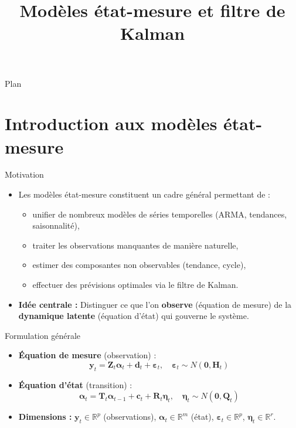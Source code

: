 \documentclass[11pt,aspectratio=169]{beamer}
\title{Modèles état-mesure et filtre de Kalman}
\author{}
\date{}
\institute{}
\newcommand{\R}{\mathbb{R}}
\begin{document}
\begin{frame}
\titlepage
\end{frame}

\begin{frame}{Plan}
\tableofcontents
\end{frame}

\section{Introduction aux modèles état-mesure}

\begin{frame}{Motivation}

\begin{itemize}

\item Les modèles état-mesure constituent un cadre général permettant de :
  \begin{itemize}
  \item unifier de nombreux modèles de séries temporelles (ARMA, tendances, saisonnalité),
  \item traiter les observations manquantes de manière naturelle,
  \item estimer des composantes non observables (tendance, cycle),
  \item effectuer des prévisions optimales via le filtre de Kalman.\newline
  \end{itemize}

\item \textbf{Idée centrale :} Distinguer ce que l'on \textbf{observe} (équation de mesure) de la \textbf{dynamique latente} (équation d'état) qui gouverne le système.

\end{itemize}

\end{frame}

\begin{frame}{Formulation générale}

\begin{itemize}

\item \textbf{Équation de mesure} (observation) :
  \[
  \bm{y}_t = \bm{Z}_t \bm{\alpha}_t + \bm{d}_t + \bm{\varepsilon}_t, \quad \bm{\varepsilon}_t \sim N(\bm{0}, \bm{H}_t)
  \]\newline

\item \textbf{Équation d'état} (transition) :
  \[
  \bm{\alpha}_t = \bm{T}_t \bm{\alpha}_{t-1} + \bm{c}_t + \bm{R}_t \bm{\eta}_t, \quad \bm{\eta}_t \sim N(\bm{0}, \bm{Q}_t)
  \]\newline

\item \textbf{Dimensions :} $\bm{y}_t \in \R^p$ (observations), $\bm{\alpha}_t \in \R^m$ (état), $\bm{\varepsilon}_t \in \R^p$, $\bm{\eta}_t \in \R^r$.

\end{itemize}

\end{frame}
\end{document}
